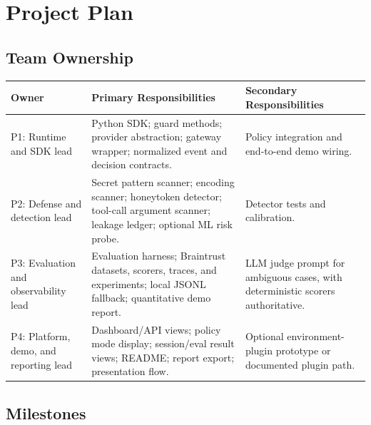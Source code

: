 \documentclass[11pt,letterpaper]{article}
\begin{document}
\section{Project Plan}

\subsection{Team Ownership}

\begin{longtable}{p{}p{}p{}}
\toprule
\textbf{Owner} & \textbf{Primary Responsibilities} & \textbf{Secondary Responsibilities} \\
\midrule
P1: Runtime and SDK lead & Python SDK; guard methods; provider abstraction; gateway wrapper; normalized event and decision contracts. & Policy integration and end-to-end demo wiring. \\
P2: Defense and detection lead & Secret pattern scanner; encoding scanner; honeytoken detector; tool-call argument scanner; leakage ledger; optional ML risk probe. & Detector tests and calibration. \\
P3: Evaluation and observability lead & Evaluation harness; Braintrust datasets, scorers, traces, and experiments; local JSONL fallback; quantitative demo report. & LLM judge prompt for ambiguous cases, with deterministic scorers authoritative. \\
P4: Platform, demo, and reporting lead & Dashboard/API views; policy mode display; session/eval result views; README; report export; presentation flow. & Optional environment-plugin prototype or documented plugin path. \\
\bottomrule
\end{longtable}

\subsection{Milestones}
\end{document}
